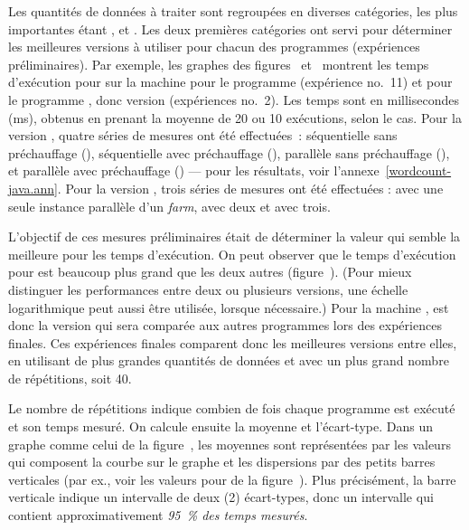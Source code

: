 Les quantités de donn\'ees à traiter sont regroup\'ees en diverses cat\'egories, les plus importantes étant ,  et . Les deux premi\`eres cat\'egories ont servi pour d\'eterminer les meilleures versions \`a utiliser pour chacun des programmes (expériences préliminaires). 
%
Par exemple, les graphes des figures~ et~ montrent les temps d'ex\'ecution pour  sur la machine  pour le programme  (expérience no.~11) et pour le programme , donc version  (expériences no.~2). Les temps sont en millisecondes (ms), obtenus en prenant la moyenne de 20 ou 10 ex\'ecutions, selon le cas.
%
Pour la version , quatre séries de mesures ont été
effectuées~: séquentielle sans préchauffage (), séquentielle
avec préchauffage (), parallèle sans préchauffage
(), et parallèle avec préchauffage () --- pour les résultats, voir l'annexe~\ref{wordcount-java.ann}.
%
Pour la version \ppff, trois  s\'eries de mesures ont \'et\'e effectu\'ees :  avec une seule instance parallèle d'un \emph{farm},  avec deux et  avec trois.



L'objectif de ces mesures pr\'eliminaires était de d\'eterminer la valeur qui semble la meilleure pour les temps d'ex\'ecution. On peut observer que le temps d'ex\'ecution pour  est beaucoup plus grand que les deux autres (figure~).
%
(Pour mieux distinguer les performances entre deux ou plusieurs versions, une échelle logarithmique peut aussi être utilis\'ee, lorsque nécessaire.)
%
Pour la machine ,  est donc la version qui sera compar\'ee aux autres programmes lors des expériences finales. Ces expériences finales comparent donc les meilleures versions entre elles, en utilisant de plus grandes quantit\'es de donn\'ees et avec un plus grand nombre de r\'ep\'etitions, soit 40.


Le nombre de r\'ep\'etitions indique combien de fois chaque programme est exécuté et son temps mesuré.
%
On calcule ensuite la moyenne et l'écart-type. Dans un graphe comme celui de la figure~, les moyennes sont repr\'esent\'ees par les valeurs qui composent la courbe sur le graphe et les dispersions par des petits barres verticales (par ex., voir les valeurs pour 
de la figure~). Plus précisément, la barre verticale indique un intervalle de deux (2) écart-types, donc un intervalle qui contient approximativement \emph{95~\% des temps mesurés}.



